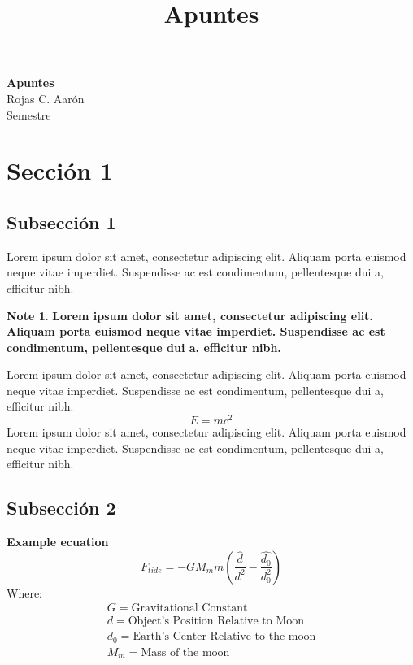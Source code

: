 \documentclass[11pt]{article}
\theoremstyle{definition}
\newtheorem{note}{Note}
\begin{document}
\setcounter{section}{0}
\title{Apuntes}	
\thispagestyle{empty}	
\begin{center}
	{\LARGE \bf Apuntes}\\
	Rojas C. Aarón\\
	Semestre\\
\end{center}
\section{Sección 1}
\subsection{Subsección 1}
Lorem ipsum dolor sit amet, consectetur adipiscing elit. Aliquam porta euismod neque vitae imperdiet. Suspendisse ac est condimentum, pellentesque dui a, efficitur nibh. 
	\begin{note}
	\textbf{Lorem ipsum dolor sit amet, consectetur adipiscing elit. Aliquam porta euismod neque vitae imperdiet. Suspendisse ac est condimentum, pellentesque dui a, efficitur nibh.}
	\end{note}
Lorem ipsum dolor sit amet, consectetur adipiscing elit. Aliquam porta euismod neque vitae imperdiet. Suspendisse ac est condimentum, pellentesque dui a, efficitur nibh.
$$E=mc^{2}$$
Lorem ipsum dolor sit amet, consectetur adipiscing elit. Aliquam porta euismod neque vitae imperdiet. Suspendisse ac est condimentum, pellentesque dui a, efficitur nibh.
\subsection{Subsección 2}
	\begin{shaded}
	\textbf{Example ecuation} \newline
		\begin{equation}
		F_{tide} = -GM_mm(\frac{\hat{d}}{d^2}-\frac{\hat{d_0}}{d_0^2})
		\end{equation}
	Where:
		\begin{equation*}
			\begin{split}
			G = \text{Gravitational Constant} \\
			d = \text{Object's Position Relative to Moon} \\
			d_0 = \text{Earth's Center Relative to the moon}\\
			M_m = \text{Mass of the moon}
			\end{split}
		\end{equation*}
	\end{shaded}
\newpage
\end{document}
